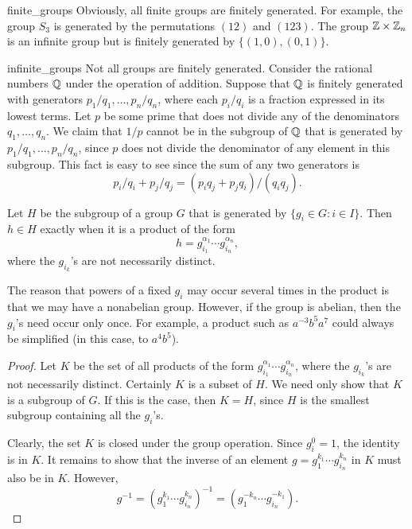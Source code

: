  
\begin{example}{finite_groups}
Obviously, all finite groups are finitely generated. For example, the
group $S_3$ is generated by the permutations $(12)$ and $(123)$. The
group ${\Bbb Z} \times {\Bbb Z}_n$ is an infinite group but is
finitely generated by $\{ (1,0), (0,1) \}$.
\end{example}
 
 
 
\begin{example}{infinite_groups}
Not all groups are finitely generated.  Consider the rational numbers
${\Bbb Q}$ under the operation of addition. Suppose that ${\Bbb Q}$ is
finitely generated with generators $p_1/q_1, \ldots, p_n/q_n$, where
each $p_i/q_i$ is a fraction expressed in its lowest terms.  Let $p$
be some prime that does not divide any of the denominators $q_1,
\ldots, q_n$. We claim that $1/p$ cannot be in the subgroup of ${\Bbb
Q}$ that is generated by  $p_1/q_1, \ldots, p_n/q_n$, since $p$ does
not divide the denominator of any element in this subgroup. This fact
is easy to see since the sum of any two generators is
\[
p_i / q_i + p_j / q_j = (p_i q_j + p_j q_i)/(q_i q_j).
\]
\end{example}
 
 
\begin{theorem}
Let $H$ be the subgroup of a group $G$ that is generated by $\{ g_i
\in G : i \in I \}$. Then $h \in H$ exactly when it is a product of
the form 
\[
h = g_{i_1}^{\alpha_1} \cdots g_{i_n}^{\alpha_n},
\]
where the $g_{i_k}$'s are not necessarily distinct.
\end{theorem}
 
 
The reason that powers of a fixed $g_i$ may occur several times in the
product is that we may have a nonabelian group. However, if the group
is abelian, then the $g_i$'s need occur only once. For example, a
product such as $a^{-3} b^5 a^7$ could always be simplified (in this
case, to $a^4 b^5$). 
 
 
\medskip
 
 
\begin{proof}
Let $K$ be the set of all products of the form $g_{i_1}^{\alpha_1}
\cdots g_{i_n}^{\alpha_n}$, where the $g_{i_k}$'s are not necessarily
distinct. Certainly $K$ is a subset of $H$.  We need only show that
$K$ is a subgroup of $G$. If this is the case, then $K=H$, since $H$ is
the smallest subgroup containing all the $g_i$'s.
 
 
Clearly, the set $K$ is closed under the group operation. Since $g_i^0
=1$, the identity is in $K$. It remains to show that the inverse of an
element  $g =g_1^{k_1} \cdots g_{i_n}^{k_n}$ in $K$ must also be in
$K$. However, 
\[
g^{-1}
= (g_1^{k_1} \cdots g_{i_n}^{k_n})^{-1}
= (g_1^{-k_n} \cdots g_{i_n}^{-k_1}).
\]
\end{proof}
 
